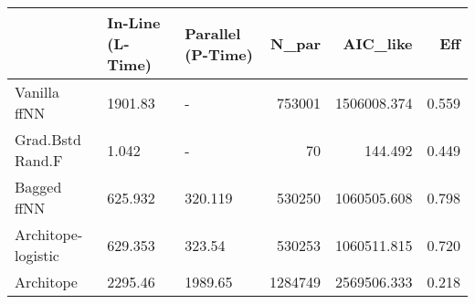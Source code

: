 \begin{tabular}{lllrrr}
\toprule
{} & In-Line (L-Time) & Parallel (P-Time) &    N\_par &     AIC\_like &    Eff \\
\midrule
Vanilla ffNN       &          1901.83 &                 - &   753001 &  1506008.374 &  0.559 \\
Grad.Bstd Rand.F   &            1.042 &                 - &       70 &      144.492 &  0.449 \\
Bagged ffNN        &          625.932 &           320.119 &   530250 &  1060505.608 &  0.798 \\
Architope-logistic &          629.353 &            323.54 &   530253 &  1060511.815 &  0.720 \\
Architope          &          2295.46 &           1989.65 &  1284749 &  2569506.333 &  0.218 \\
\bottomrule
\end{tabular}
